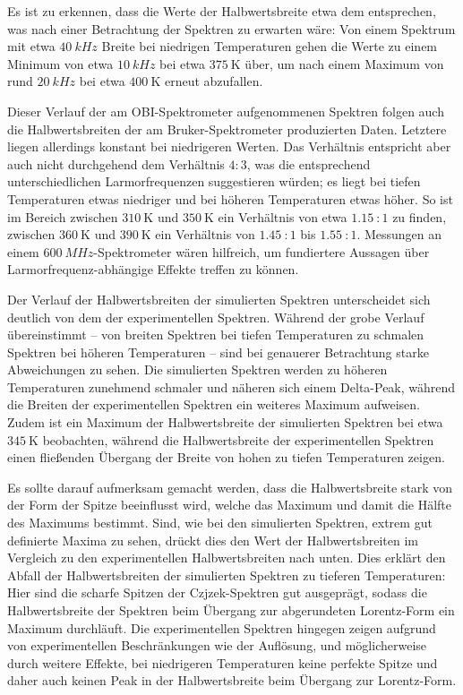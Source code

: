 Es ist zu erkennen, dass die Werte der Halbwertsbreite etwa dem entsprechen, was nach einer Betrachtung der Spektren zu erwarten wäre: Von einem Spektrum mit etwa $\SI{40}{kHz}$ Breite bei niedrigen Temperaturen gehen die Werte zu einem Minimum von etwa $\SI{10}{kHz}$ bei etwa $\SI{375}{\kelvin}$ über, um nach einem Maximum von rund $\SI{20}{kHz}$ bei etwa $\SI{400}{\kelvin}$ erneut abzufallen.

Dieser Verlauf der am OBI-Spektrometer aufgenommenen Spektren folgen auch die Halbwertsbreiten der am Bruker-Spektrometer produzierten Daten. Letztere liegen allerdings konstant bei niedrigeren Werten. Das Verhältnis entspricht aber auch nicht durchgehend dem Verhältnis $4:3$, was die entsprechend unterschiedlichen Larmorfrequenzen suggestieren würden; es liegt bei tiefen Temperaturen etwas niedriger und bei höheren Temperaturen etwas höher. So ist im Bereich zwischen $\SI{310}{\kelvin}$ und $\SI{350}{\kelvin}$ ein Verhältnis von etwa $\SI{1.15}{}:1$ zu finden, zwischen $\SI{360}{\kelvin}$ und $\SI{390}{\kelvin}$ ein Verhältnis von $\SI{1.45}{}:1$ bis $\SI{1.55}{}:1$. Messungen an einem $\SI{600}{MHz}$-Spektrometer wären hilfreich, um fundiertere Aussagen über Larmorfrequenz-abhängige Effekte treffen zu können.

Der Verlauf der Halbwertsbreiten der simulierten Spektren unterscheidet sich deutlich von dem der experimentellen Spektren. Während der grobe Verlauf übereinstimmt -- von breiten Spektren bei tiefen Temperaturen zu schmalen Spektren bei höheren Temperaturen -- sind bei genauerer Betrachtung starke Abweichungen zu sehen. Die simulierten Spektren werden zu höheren Temperaturen zunehmend schmaler und näheren sich einem Delta-Peak, während die Breiten der experimentellen Spektren ein weiteres Maximum aufweisen. Zudem ist ein Maximum der Halbwertsbreite der simulierten Spektren bei etwa $\SI{345}{\kelvin}$ beobachten, während die Halbwertsbreite der experimentellen Spektren einen fließenden Übergang der Breite von hohen zu tiefen Temperaturen zeigen.

Es sollte darauf aufmerksam gemacht werden, dass die Halbwertsbreite stark von der Form der Spitze beeinflusst wird, welche das Maximum und damit die Hälfte des Maximums bestimmt. Sind, wie bei den simulierten Spektren, extrem gut definierte Maxima zu sehen, drückt dies den Wert der Halbwertsbreiten im Vergleich zu den experimentellen Halbwertsbreiten nach unten. Dies erklärt den Abfall der Halbwertsbreiten der simulierten Spektren zu tieferen Temperaturen: Hier sind die scharfe Spitzen der Czjzek-Spektren gut ausgeprägt, sodass die Halbwertsbreite der Spektren beim Übergang zur abgerundeten Lorentz-Form ein Maximum durchläuft. Die experimentellen Spektren hingegen zeigen aufgrund von experimentellen Beschränkungen wie der Auflösung, und möglicherweise durch weitere Effekte, bei niedrigeren Temperaturen keine perfekte Spitze und daher auch keinen Peak in der Halbwertsbreite beim Übergang zur Lorentz-Form.



